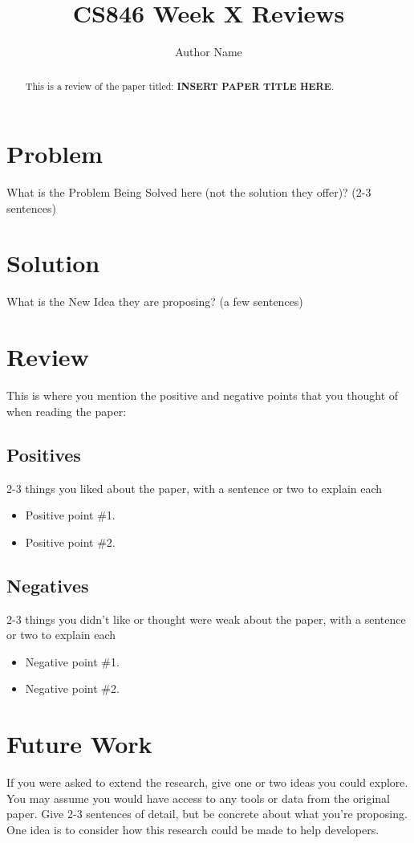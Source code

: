 \documentclass[sigconf, 10pt]{acmart}
\begin{document}
\title[Short Title]{CS846 Week X Reviews}
\author{Author Name}
\begin{abstract}
    This is a review of the paper titled: \textbf{INSERT PAPER TITLE HERE}.
\end{abstract}
\maketitle
\balance
\section{Problem}
What is the Problem Being Solved here (not the solution they offer)? (2-3 sentences)
\section{Solution}
What is the New Idea they are proposing?  (a few sentences)
\section{Review}
This is where you mention the positive and negative points that you thought of when reading the paper:
\subsection{Positives}
2-3 things you liked about the paper, with a sentence or two to explain each
\begin{itemize}
    \item Positive point \#1.
    \item Positive point \#2.
\end{itemize}

\subsection{Negatives}
2-3 things you didn't like or thought were weak about the paper, with a sentence or two to explain each
\begin{itemize}
    \item Negative point \#1.
    \item Negative point \#2.
\end{itemize}

\section{Future Work}
If you were asked to extend the research, give one or two ideas you could explore.  You may assume you would have access to any tools or data from the original paper.  Give 2-3 sentences of detail, but be concrete about what you're proposing.  One idea is to consider how this research could be made to help developers.
\end{document}
